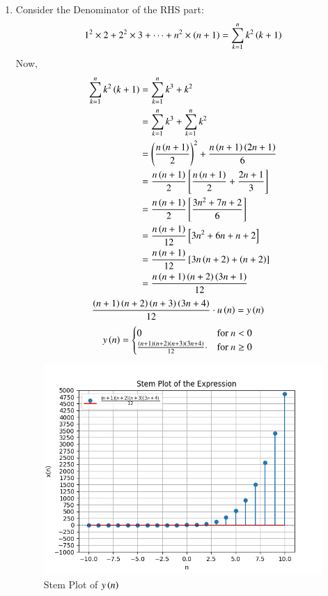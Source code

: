 \documentclass[journal,12pt,twocolumn]{IEEEtran}
\theoremstyle{remark}
\begin{document}
\begin{enumerate}[label=\arabic*.]
\item Consider the Denominator of the RHS part:
\begin{equation}
    1^2\times2 + 2^2\times3 +\dots + n^2\times\left(n+1\right) = \sum_{k=1}^n k^2\left(k+1\right)
\end{equation}
Now,
\begin{align}
     \sum_{k=1}^n k^2\left(k+1\right) &= \sum_{k=1}^n k^3+k^2\\
                           &=  \sum_{k=1}^n k^3 + \sum_{k=1}^n k^2\\
                           &=  \left(\frac{n\left(n+1\right)}{2}\right)^{\scriptstyle 2}+\frac{n\left(n+1\right)\left(2n+1\right)}{6}\\ 
                           &= \frac{n\left(n+1\right)}{2}\left[\frac{n\left(n+1\right)}{2} +\frac{2n+1}{3}\right]\\
                           &= \frac{n\left(n+1\right)}{2}\left[\frac{3n^2+7n+2}{6}\right]\\
                           &= \frac{n\left(n+1\right)}{12}\left[3n^2+6n + n+2\right]\\
                           &= \frac{n\left(n+1\right)}{12}\left[3n\left(n+2\right)+\left(n+2\right)\right]\\
                           &= \frac{n\left(n+1\right)\left(n+2\right)\left(3n+1\right)}{12}
\end{align}
\begin{align}
    \frac{\left(n+1\right)\left(n+2\right)\left(n+3\right)\left(3n+4\right)}{12}\cdot u\left(n\right) &= y\left(n\right)
\end{align}
\begin{align}
     y\left(n\right) & = \begin{cases}
        0 & \text{for } n < 0 \\
        \frac{\left(n+1\right)\left(n+2\right)\left(n+3\right)\left(3n+4\right)}{12}\cdot& \text{for } n \geq 0
    \end{cases}
\end{align}
\begin{figure}[h]
    \centering
    \includegraphics[width=\columnwidth]{Figure_2.png}
    \caption{Stem Plot of $y\left(n\right)$}
\end{figure}
\vspace{1cm}


\end{enumerate}
\end{document}
